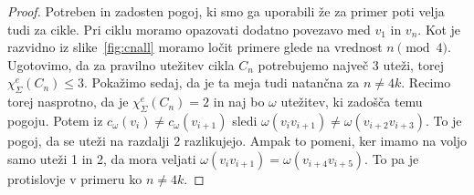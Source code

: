 \documentclass[12pt,a4paper,twoside]{article}
\theoremstyle{definition} %
\theoremstyle{plain} %
\newcommand{\ec}{\chi_{\Sigma}^e}
\numberwithin{equation}{section}  %
\begin{document}
\begin{proof}
%		
%		
%		
%	
%		
%		
%		
%
Potreben in zadosten pogoj, ki smo ga uporabili že za primer poti velja tudi za cikle. Pri ciklu moramo opazovati dodatno povezavo med $v_1$ in $v_n$. Kot je razvidno iz slike~\ref{fig:cnall} moramo ločit primere glede na vrednost $n \pmod{4}$. Ugotovimo, da za pravilno utežitev cikla $C_n$ potrebujemo največ 3 uteži, torej $\ec(C_n) \le 3$. Pokažimo sedaj, da je ta meja tudi natančna za $n \neq 4k$. Recimo torej nasprotno, da je $\ec(C_n) = 2$ in naj bo $\omega$ utežitev, ki zadošča temu pogoju. Potem iz $c_{\omega}(v_i) \neq c_{\omega}(v_{i+1})$ sledi $\omega(v_i v_{i+1}) \neq \omega({v_{i+2} v_{i+3}})$. To je pogoj, da se uteži na razdalji $2$ razlikujejo. Ampak to pomeni, ker imamo na voljo samo uteži 1 in 2, da mora veljati $\omega(v_i v_{i+1}) = \omega({v_{i+4} v_{i+5}})$. To pa je protislovje v primeru ko $n \neq 4k$.


\end{proof}
\end{document}
